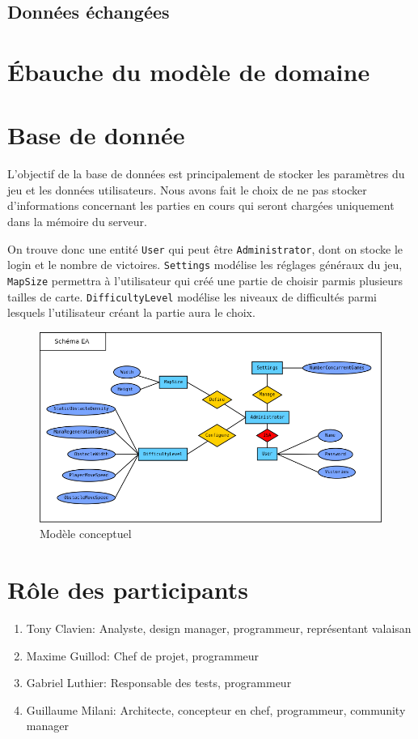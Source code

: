 \documentclass[a4paper,11pt]{article}
\begin{document}
		\subsection{Données échangées}

	\section{Ébauche du modèle de domaine}

	\section{Base de donnée}
	L'objectif de la base de données est principalement de stocker les paramètres du jeu et les données utilisateurs. Nous avons fait le choix de ne pas stocker d'informations concernant les parties en cours qui seront chargées uniquement dans la mémoire du serveur. \par

	On trouve donc une entité \texttt{User} qui peut être \texttt{Administrator}, dont on stocke le login et le nombre de victoires. \texttt{Settings} modélise les réglages généraux du jeu, \texttt{MapSize} permettra à l'utilisateur qui créé une partie de choisir parmis plusieurs tailles de carte. \texttt{DifficultyLevel} modélise les niveaux de difficultés parmi lesquels l'utilisateur créant la partie aura le choix.
	\begin{figure}[ht]
		\centering
		\includegraphics[width=\textwidth]{../Database/ER_diagram.png}
		\caption{Modèle conceptuel}
		\label{database_er}
	\end{figure}

	\section{Rôle des participants}
		\begin{enumerate}
			\item Tony Clavien: Analyste, design manager, programmeur, représentant valaisan
			\item Maxime Guillod: Chef de projet, programmeur
			\item Gabriel Luthier: Responsable des tests, programmeur
			\item Guillaume Milani: Architecte, concepteur en chef, programmeur, community manager
		\end{enumerate}
\end{document}
